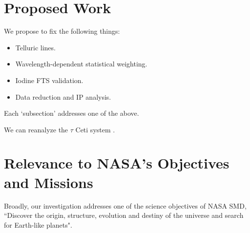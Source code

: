 \documentclass[12pt]{article}
\begin{document}
\vspace{-3pt}
\section{Proposed Work}

We propose to fix the following things:
\begin{itemize}
  \item Telluric lines.
  \item Wavelength-dependent statistical weighting.
  \item Iodine FTS validation.
  \item Data reduction and IP analysis.
\end{itemize}

Each `subsection' addresses one of the above.

We can reanalyze the $\tau$ Ceti system \citep{tuomi2013}. 

\begin{comment}
\begin{wrapfigure}{r}{0.51\textwidth}
  \vspace{-35pt}
  \begin{center}
    \texttt{[image: 37605]}
  \end{center}
  \vspace{-25pt}  
  \caption{Plot 1.}
  \vspace{-8pt}  
  \label{fit}
\end{wrapfigure}
\end{comment}


 
\vspace{-3pt}
\section{Relevance to NASA's Objectives and Missions}

Broadly, our investigation addresses one of the science
objectives of NASA SMD, ``Discover the origin, structure, evolution
and destiny of the universe and search for Earth-like planets".
\end{document}
